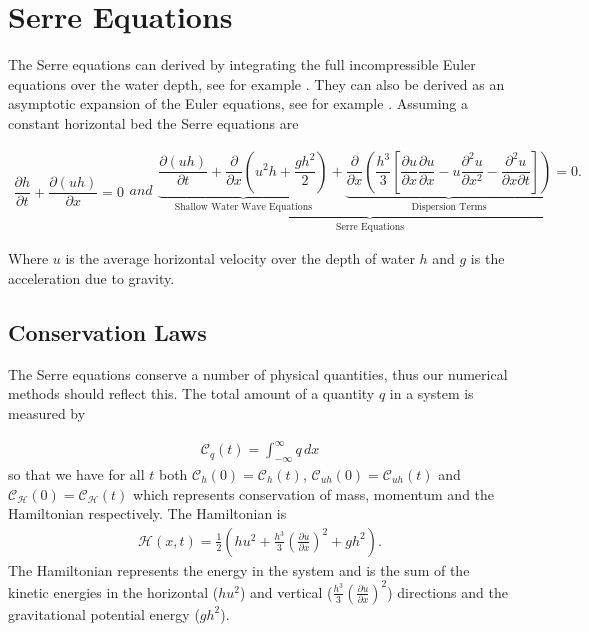 \documentclass[SingleSpace,12pt,Proceedings]{Serre_ASCE}
\begin{document}
\section{Serre Equations}
\label{section:Serre Equations}
The Serre equations can derived by integrating the full incompressible Euler equations over the water depth, see for example . They can also be derived as an asymptotic expansion of the Euler equations, see for example . Assuming a constant horizontal bed the Serre equations are \cite{Guyenne-etal-2014-169}
\begin{linenomath*}
\begin{subequations}\label{eq:Serre_nonconservative_form}
\begin{gather}
\dfrac{\partial h}{\partial t} + \dfrac{\partial (uh)}{\partial x} = 0
\label{eq:Serre_continuity}
\end{gather}
and
\begin{gather}
\underbrace{\underbrace{\dfrac{\partial (uh)}{\partial t} + \dfrac{\partial}{\partial x} \left ( u^2h + \dfrac{gh^2}{2}\right )}_{\text{Shallow Water Wave Equations}} + \underbrace{\dfrac{\partial}{\partial x} \left (  \dfrac{h^3}{3} \left [ \dfrac{\partial u }{\partial x} \dfrac{\partial u}{\partial x} - u\dfrac{\partial^2 u}{\partial x^2}  - \dfrac{\partial^2 u}{\partial x \partial t}\right ] \right )}_{\text{Dispersion Terms}} = 0.}_{\text{Serre Equations}}
\label{eq:Serre_momentum}
\end{gather}
\end{subequations}
\end{linenomath*}
Where $u$ is the average horizontal velocity over the depth of water $h$ and $g$ is the acceleration due to gravity. 

\subsection{Conservation Laws}
The Serre equations conserve a number of physical quantities, thus our numerical methods should reflect this. The total amount of a quantity $q$ in a system is measured by

\begin{gather}
\label{eqn:Condef}
\mathcal{C}_q(t) = \int_{-\infty}^{\infty} q\, dx
\end{gather}
so that we have for all $t$ both $\mathcal{C}_{h}(0) = \mathcal{C}_{h}(t)$, $\mathcal{C}_{uh}(0) = \mathcal{C}_{uh}(t)$ and $\mathcal{C}_{\mathcal{H}}(0) = \mathcal{C}_{\mathcal{H}}(t)$  which represents conservation of mass, momentum and the Hamiltonian \cite{Li-Y-2002,Hank-etal-2010-2034,Green-Naghdi-1976-237} respectively. The Hamiltonian is
\begin{gather}
\label{eqn:Hamildef}
\mathcal{H}(x,t) = \frac{1}{2} \left(hu^2 + \frac{h^3}{3} \left(\frac{\partial u}{\partial x}\right)^2 + gh^2\right).
\end{gather}
The Hamiltonian represents the energy in the system and is the sum of the kinetic energies in the horizontal ($hu^2$) and vertical ($\frac{h^3}{3} \left(\frac{\partial u}{\partial x}\right)^2$) directions and the gravitational potential energy ($gh^2$).   
\end{document}
